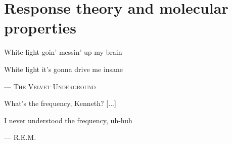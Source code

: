 \chapter{Response theory and molecular properties}\label{ch:molprop}

\epigraph{
White light goin' messin' up my brain

White light it's gonna drive me insane
}{
--- \textsc{The Velvet Underground}
}

\epigraph{What's the frequency, Kenneth? [...]

          I never understood the frequency, uh-huh}{
          --- \textsc{R.E.M.}}

